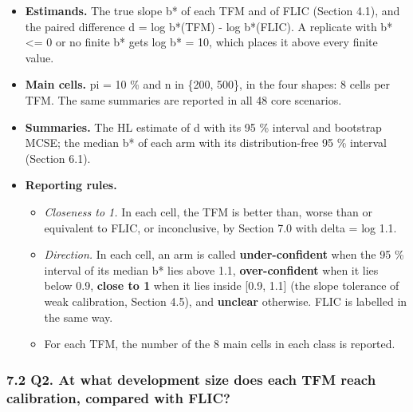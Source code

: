 \documentclass[
  10pt,
]{article}
\providecommand{\tightlist}{%
  \setlength{\itemsep}{0pt}\setlength{\parskip}{0pt}}
\begin{document}
\begin{itemize}
\tightlist
\item
  \textbf{Estimands.} The true slope b* of each TFM and of
  FLIC (Section 4.1), and the paired difference d =
  \textbar log b*(TFM)\textbar{} - \textbar log
  b*(FLIC)\textbar. A replicate with b* \textless= 0 or no
  finite b* gets \textbar log b*\textbar{} = 10, which
  places it above every finite value.
\item
  \textbf{Main cells.} pi = 10 \% and n in \{200, 500\}, in
  the four shapes: 8 cells per TFM. The same summaries are
  reported in all 48 core scenarios.
\item
  \textbf{Summaries.} The HL estimate of d with its 95 \%
  interval and bootstrap MCSE; the median b* of each arm
  with its distribution-free 95 \% interval (Section 6.1).
\item
  \textbf{Reporting rules.}

  \begin{itemize}
  \tightlist
  \item
    \emph{Closeness to 1.} In each cell, the TFM is better
    than, worse than or equivalent to FLIC, or inconclusive,
    by Section 7.0 with delta = log 1.1.
  \item
    \emph{Direction.} In each cell, an arm is called
    \textbf{under-confident} when the 95 \% interval of its
    median b* lies above 1.1, \textbf{over-confident} when
    it lies below 0.9, \textbf{close to 1} when it lies
    inside {[}0.9, 1.1{]} (the slope tolerance of weak
    calibration, Section 4.5), and \textbf{unclear}
    otherwise. FLIC is labelled in the same way.
  \item
    For each TFM, the number of the 8 main cells in each
    class is reported.
  \end{itemize}
\end{itemize}

\subsubsection{7.2 Q2. At what development size does each
TFM reach calibration, compared with
FLIC?}\label{q2.-at-what-development-size-does-each-tfm-reach-calibration-compared-with-flic}
\end{document}
